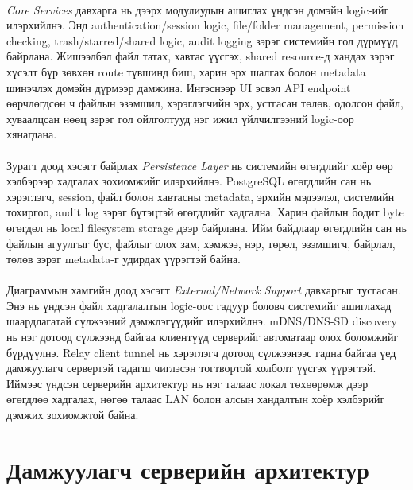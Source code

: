 \paragraph{}
\textit{Core Services} давхарга нь дээрх модулиудын ашиглах үндсэн домэйн logic-ийг илэрхийлнэ. Энд authentication/session logic, file/folder management, permission checking, trash/starred/shared logic, audit logging зэрэг системийн гол дүрмүүд байрлана. Жишээлбэл файл татах, хавтас үүсгэх, shared resource-д хандах зэрэг хүсэлт бүр зөвхөн route түвшинд биш, харин эрх шалгах болон metadata шинэчлэх домэйн дүрмээр дамжина. Ингэснээр UI эсвэл API endpoint өөрчлөгдсөн ч файлын эзэмшил, хэрэглэгчийн эрх, устгасан төлөв, одолсон файл, хуваалцсан нөөц зэрэг гол ойлголтууд нэг ижил үйлчилгээний logic-оор хянагдана.

\paragraph{}
Зурагт доод хэсэгт байрлах \textit{Persistence Layer} нь системийн өгөгдлийг хоёр өөр хэлбэрээр хадгалах зохиомжийг илэрхийлнэ. PostgreSQL өгөгдлийн сан нь хэрэглэгч, session, файл болон хавтасны metadata, эрхийн мэдээлэл, системийн тохиргоо, audit log зэрэг бүтэцтэй өгөгдлийг хадгална. Харин файлын бодит byte өгөгдөл нь local filesystem storage дээр байрлана. Ийм байдлаар өгөгдлийн сан нь файлын агуулгыг бус, файлыг олох зам, хэмжээ, нэр, төрөл, эзэмшигч, байрлал, төлөв зэрэг metadata-г удирдах үүрэгтэй байна.

\paragraph{}
Диаграммын хамгийн доод хэсэгт \textit{External/Network Support} давхаргыг тусгасан. Энэ нь үндсэн файл хадгалалтын logic-оос гадуур боловч системийг ашиглахад шаардлагатай сүлжээний дэмжлэгүүдийг илэрхийлнэ. mDNS/DNS-SD discovery нь нэг дотоод сүлжээнд байгаа клиентүүд серверийг автоматаар олох боломжийг бүрдүүлнэ. Relay client tunnel нь хэрэглэгч дотоод сүлжээнээс гадна байгаа үед дамжуулагч сервертэй гадагш чиглэсэн тогтвортой холболт үүсгэх үүрэгтэй. Иймээс үндсэн серверийн архитектур нь нэг талаас локал төхөөрөмж дээр өгөгдлөө хадгалах, нөгөө талаас LAN болон алсын хандалтын хоёр хэлбэрийг дэмжих зохиомжтой байна.

\section{Дамжуулагч серверийн архитектур}
